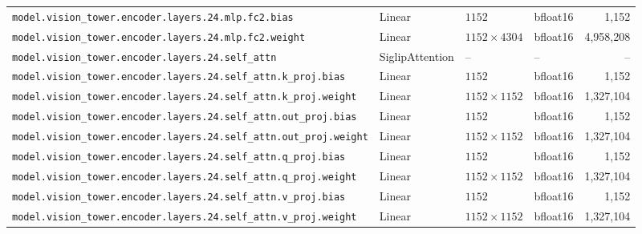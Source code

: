 \documentclass[10pt,a4paper]{article}
\theoremstyle{definition}
\begin{document}
\begin{appendices}
{\begin{longtable}{p{6.8cm}>{\raggedright\arraybackslash}p{3.3cm}llr}
\texttt{model.\allowbreak{}vision\_tower.\allowbreak{}encoder.\allowbreak{}layers.\allowbreak{}24.\allowbreak{}mlp.\allowbreak{}fc2.\allowbreak{}bias} & Linear & $1152$ & bfloat16 & 1,152 \\
\texttt{model.\allowbreak{}vision\_tower.\allowbreak{}encoder.\allowbreak{}layers.\allowbreak{}24.\allowbreak{}mlp.\allowbreak{}fc2.\allowbreak{}weight} & Linear & $1152 \times 4304$ & bfloat16 & 4,958,208 \\
\texttt{model.\allowbreak{}vision\_tower.\allowbreak{}encoder.\allowbreak{}layers.\allowbreak{}24.\allowbreak{}self\_attn} & Siglip\allowbreak{}Attention & -- & -- & -- \\
\texttt{model.\allowbreak{}vision\_tower.\allowbreak{}encoder.\allowbreak{}layers.\allowbreak{}24.\allowbreak{}self\_attn.\allowbreak{}k\_proj.\allowbreak{}bias} & Linear & $1152$ & bfloat16 & 1,152 \\
\texttt{model.\allowbreak{}vision\_tower.\allowbreak{}encoder.\allowbreak{}layers.\allowbreak{}24.\allowbreak{}self\_attn.\allowbreak{}k\_proj.\allowbreak{}weight} & Linear & $1152 \times 1152$ & bfloat16 & 1,327,104 \\
\texttt{model.\allowbreak{}vision\_tower.\allowbreak{}encoder.\allowbreak{}layers.\allowbreak{}24.\allowbreak{}self\_attn.\allowbreak{}out\_proj.\allowbreak{}bias} & Linear & $1152$ & bfloat16 & 1,152 \\
\texttt{model.\allowbreak{}vision\_tower.\allowbreak{}encoder.\allowbreak{}layers.\allowbreak{}24.\allowbreak{}self\_attn.\allowbreak{}out\_proj.\allowbreak{}weight} & Linear & $1152 \times 1152$ & bfloat16 & 1,327,104 \\
\texttt{model.\allowbreak{}vision\_tower.\allowbreak{}encoder.\allowbreak{}layers.\allowbreak{}24.\allowbreak{}self\_attn.\allowbreak{}q\_proj.\allowbreak{}bias} & Linear & $1152$ & bfloat16 & 1,152 \\
\texttt{model.\allowbreak{}vision\_tower.\allowbreak{}encoder.\allowbreak{}layers.\allowbreak{}24.\allowbreak{}self\_attn.\allowbreak{}q\_proj.\allowbreak{}weight} & Linear & $1152 \times 1152$ & bfloat16 & 1,327,104 \\
\texttt{model.\allowbreak{}vision\_tower.\allowbreak{}encoder.\allowbreak{}layers.\allowbreak{}24.\allowbreak{}self\_attn.\allowbreak{}v\_proj.\allowbreak{}bias} & Linear & $1152$ & bfloat16 & 1,152 \\
\texttt{model.\allowbreak{}vision\_tower.\allowbreak{}encoder.\allowbreak{}layers.\allowbreak{}24.\allowbreak{}self\_attn.\allowbreak{}v\_proj.\allowbreak{}weight} & Linear & $1152 \times 1152$ & bfloat16 & 1,327,104 \\

\end{longtable}}
\end{appendices}
\end{document}
